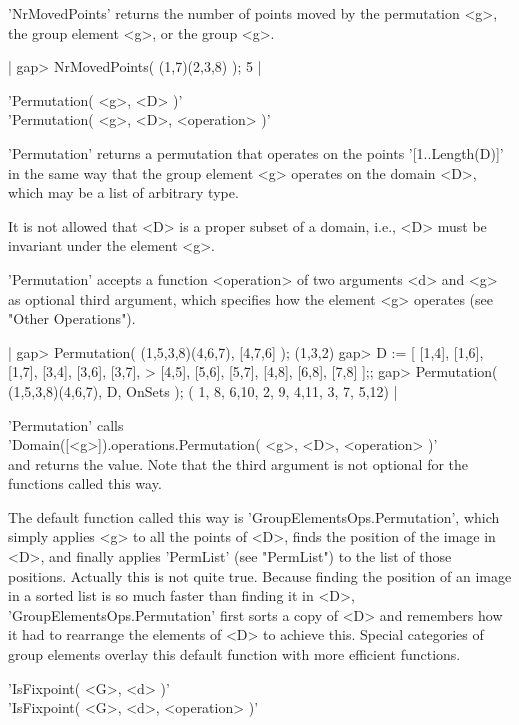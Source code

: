 'NrMovedPoints'  returns the number of points moved by the permutation <g>,
the group element <g>, or the group <g>.

|    gap> NrMovedPoints( (1,7)(2,3,8) );
     5  |


'Permutation( <g>, <D> )' \\
'Permutation( <g>, <D>, <operation> )'

'Permutation'   returns  a  permutation that   operates   on the   points
'[1..Length(D)]' in the same way  that the group  element <g> operates on
the domain <D>, which may be a list of arbitrary type.

It is not allowed that <D> is a proper subset of a domain, i.e., <D> must
be invariant under the element <g>.

'Permutation' accepts a function <operation> of two arguments <d> and <g>
as optional third argument, which  specifies how the element <g> operates
(see "Other Operations").

|    gap> Permutation( (1,5,3,8)(4,6,7), [4,7,6] );
    (1,3,2)
    gap> D := [ [1,4], [1,6], [1,7], [3,4], [3,6], [3,7],
    >           [4,5], [5,6], [5,7], [4,8], [6,8], [7,8] ];;
    gap> Permutation( (1,5,3,8)(4,6,7), D, OnSets );
    ( 1, 8, 6,10, 2, 9, 4,11, 3, 7, 5,12) |

'Permutation' calls \\
'Domain([<g>]).operations.Permutation( <g>, <D>, <operation> )' \\
and returns the value.  Note that the  third argument is not optional for
the functions called this way.

The default  function called this  way is 'GroupElementsOps.Permutation',
which simply applies <g> to all the points of  <D>, finds the position of
the image in <D>, and finally applies 'PermList'  (see "PermList") to the
list of those positions.   Actually this  is  not  quite  true.   Because
finding the position of an image in a sorted list is so  much faster than
finding it in <D>,  'GroupElementsOps.Permutation' first sorts  a copy of
<D> and remembers how it had to rearrange the elements  of <D> to achieve
this.  Special categories of group elements overlay this default function
with more efficient functions.


'IsFixpoint( <G>, <d> )' \\
'IsFixpoint( <G>, <d>, <operation> )'

